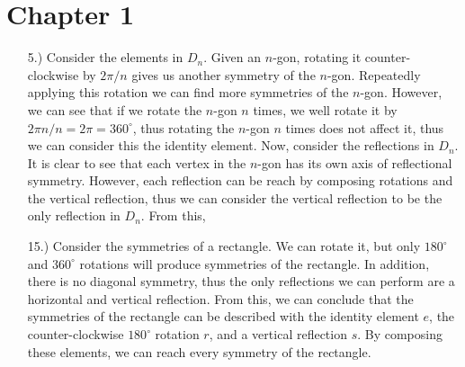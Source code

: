 \documentclass[12pt]{article}
\begin{document}
\pagestyle{fancy}
\fancyhead{}

\normalsize

\section*{Chapter 1}
\begin{itemize}
    \item [5.)] Consider the elements in $D_n$. Given an $n$-gon, rotating it counter-clockwise by $2\pi/n$ gives us another symmetry of the $n$-gon. Repeatedly applying this rotation we can find more symmetries of the $n$-gon. However, we can see that if we rotate the $n$-gon $n$ times, we well rotate it by $2\pi n/n=2\pi=360^\circ$, thus rotating the $n$-gon $n$ times does not affect it, thus we can consider this the identity element. Now, consider the reflections in $D_n$. It is clear to see that each vertex in the $n$-gon has its own axis of reflectional symmetry. However, each reflection can be reach by composing rotations and the vertical reflection, thus we can consider the vertical reflection to be the only reflection in $D_n$. From this, 

    \item [15.)] Consider the symmetries of a rectangle. We can rotate it, but only $180^\circ$ and $360^\circ$ rotations will produce symmetries of the rectangle. In addition, there is no diagonal symmetry, thus the only reflections we can perform are a horizontal and vertical reflection. From this, we can conclude that the symmetries of the rectangle can be described with the identity element $e$, the counter-clockwise $180^\circ$ rotation $r$, and a vertical reflection $s$. By composing these elements, we can reach every symmetry of the rectangle.

\end{itemize}
\end{document}
